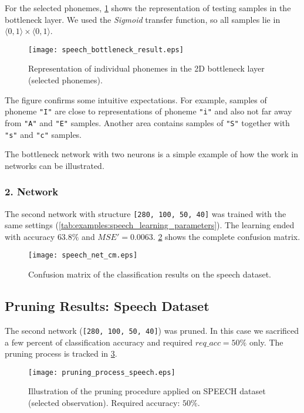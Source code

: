 For the selected phonemes, \cref{fig:examples:speech_bottleneck_result} shows the representation of testing samples in the bottleneck layer. We used the \textit{Sigmoid} transfer function, so all samples lie in $ \langle 0,1\rangle \times \langle 0,1\rangle $.

\begin{figure}[H]
\centering
\texttt{[image: speech\_bottleneck\_result.eps]}
\caption{Representation of individual phonemes in the 2D bottleneck layer (selected phonemes).}
\label{fig:examples:speech_bottleneck_result}
\end{figure}

The figure confirms some intuitive expectations. For example, samples of phoneme \texttt{"I"} are close to representations of phoneme \texttt{"i"} and also not far away from \texttt{"A"} and \texttt{"E"} samples. Another area contains samples of \texttt{"S"} together with \texttt{"s"} and \texttt{"c"} samples.

The bottleneck network with two neurons is a simple example of how the work in networks can be illustrated.

\subsubsection*{2. Network}
The second network with structure \texttt{[280, 100, 50, 40]} was trained with the same settings (\cref{tab:examples:speech_learning_parameters}). The learning ended with accuracy $ 63.8\% $ and $ MSE' = 0.0063 $. \cref{fig:examples:speech_net_cm} shows the complete confusion matrix.

\begin{figure}[H]
\centering
\texttt{[image: speech\_net\_cm.eps]}
\caption{Confusion matrix of the classification results on the speech dataset.}
\label{fig:examples:speech_net_cm}
\end{figure}

\subsection*{Pruning Results: Speech Dataset}
The second network (\texttt{[280, 100, 50, 40]}) was pruned. In this case we sacrificed a few percent of classification accuracy and required $ req\_acc = 50\% $ only. The pruning process is tracked in \cref{fig:examples:speech_pruning_process}.

\begin{figure}[H]
\centering
\texttt{[image: pruning\_process\_speech.eps]}
\caption{Illustration of the pruning procedure applied on SPEECH dataset (selected observation). Required accuracy: $ 50\% $.}
\label{fig:examples:speech_pruning_process}
\end{figure}

